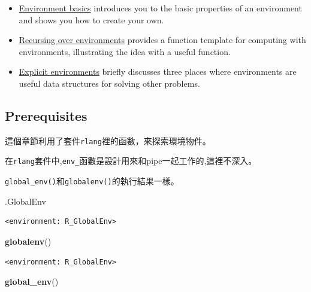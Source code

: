 \documentclass[]{book}
\newenvironment{Shaded}{\begin{snugshade}}{\end{snugshade}}
\newcommand{\KeywordTok}[1]{\textcolor[rgb]{0.13,0.29,0.53}{\textbf{#1}}}
\newcommand{\NormalTok}[1]{#1}
\theoremstyle{definition}
\theoremstyle{definition}
\theoremstyle{definition}
\theoremstyle{remark}
\begin{document}
\begin{itemize}
\item
  \protect\hyperlink{env-basics}{Environment basics} introduces you to
  the basic properties of an environment and shows you how to create
  your own.
\item
  \protect\hyperlink{env-recursion}{Recursing over environments}
  provides a function template for computing with environments,
  illustrating the idea with a useful function.
\item
  \protect\hyperlink{explicit-envs}{Explicit environments} briefly
  discusses three places where environments are useful data structures
  for solving other problems.
\end{itemize}

\hypertarget{prerequisites}{%
\subsection*{Prerequisites}\label{prerequisites}}

這個章節利用了套件\texttt{rlang}裡的函數，來探索環境物件。

在\texttt{rlang}套件中,\texttt{env\_}函數是設計用來和pipe一起工作的,這裡不深入。

\texttt{global\_env()}和\texttt{globalenv()}的執行結果一樣。

\begin{Shaded}
\begin{Highlighting}[]
\NormalTok{.GlobalEnv}
\end{Highlighting}
\end{Shaded}

\begin{verbatim}
<environment: R_GlobalEnv>
\end{verbatim}

\begin{Shaded}
\begin{Highlighting}[]
\KeywordTok{globalenv}\NormalTok{()}
\end{Highlighting}
\end{Shaded}

\begin{verbatim}
<environment: R_GlobalEnv>
\end{verbatim}

\begin{Shaded}
\begin{Highlighting}[]
\KeywordTok{global_env}\NormalTok{()}
\end{Highlighting}
\end{Shaded}
\end{document}
